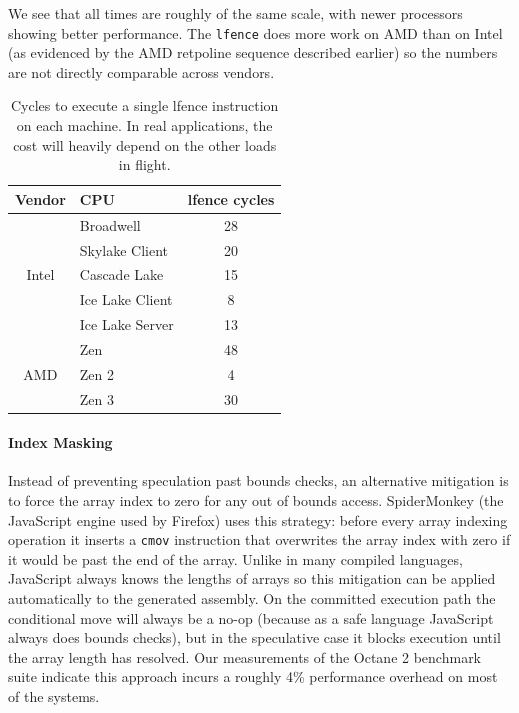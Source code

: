 We see that all times are roughly of the same scale, with newer processors showing better performance.
The \texttt{lfence} does more work on AMD than on Intel (as evidenced by the AMD retpoline sequence described earlier) so the numbers are not directly comparable across vendors.

\begin{table}[h]
  \begin{center}
  \begin{tabular}{ clc }
    \textbf{Vendor} & \textbf{CPU} & \textbf{lfence cycles} \\ \hline
    \multirow{5}{*}{Intel} & Broadwell        & 28 \\
                           & Skylake Client   & 20 \\
                           & Cascade Lake     & 15 \\
                           & Ice Lake Client  & 8 \\
                           & Ice Lake Server  & 13  \\ \hline
    \multirow{3}{*}{AMD}   & Zen              & 48 \\
                           & Zen 2            & 4 \\
                           & Zen 3            & 30 \\ \hline
  \end{tabular}
  \end{center}
  \caption{Cycles to execute a single lfence instruction on each machine.
    In real applications, the cost will heavily depend on the other loads in flight. }
  \label{table:lfence}
\end{table}

\paragraph{Index Masking}

Instead of preventing speculation past bounds checks, an alternative mitigation is to force the array index to zero for any out of bounds access.
SpiderMonkey (the JavaScript engine used by Firefox) uses this
strategy: before every array indexing operation it inserts a
\texttt{cmov} instruction that overwrites the array index with zero if it would be past the end of the array.
Unlike in many compiled languages, JavaScript always knows the lengths of arrays so this mitigation can be applied automatically to the generated assembly.
On the committed execution path the conditional move will always be a no-op (because as a safe language JavaScript always does bounds checks), but in the speculative case it blocks execution until the array length has resolved.
Our measurements of the Octane 2 benchmark suite indicate this approach incurs a roughly 4\% performance overhead on most of the systems.

